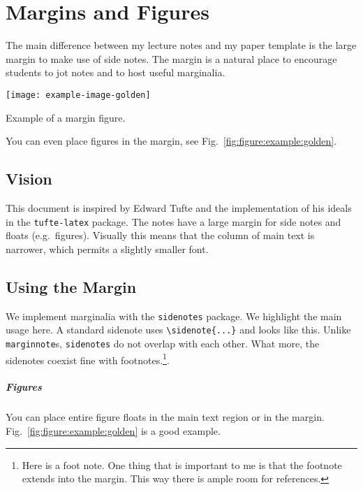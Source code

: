 
\chapter{Margins and Figures} %

The main difference between my lecture notes and my paper template is the large margin to make use of side notes. The margin is a natural place to encourage students to jot notes and to host useful marginalia.%
\begin{marginfigure}%
    \texttt{[image: example-image-golden]}
    \caption{Example of a margin figure.}
    \label{fig:figure:example:golden}
\end{marginfigure}
You can even place figures in the margin, see Fig.~\ref{fig:figure:example:golden}.

\section{Vision}

This document is inspired by Edward Tufte and the implementation of his ideals in the \texttt{tufte-latex} package. The notes have a large margin for side notes and floats (e.g.\ figures).  Visually this means that the column of main text is narrower, which permits a slightly smaller font.


\section{Using the Margin}

We implement marginalia with the \texttt{sidenotes} package. We highlight the main usage here. A standard sidenote uses \verb!\sidenote{...}! and looks like this. Unlike \verb!marginnote!s, \verb!sidenotes! do not overlap with each other. What more, the sidenotes coexist fine with footnotes.\footnote{Here is a foot note. One thing that is important to me is that the footnote extends into the margin. This way there is ample room for references.}.

\paragraph{Figures} You can place entire figure floats in the main text region or in the margin. Fig.~\ref{fig:figure:example:golden} is a good example.

